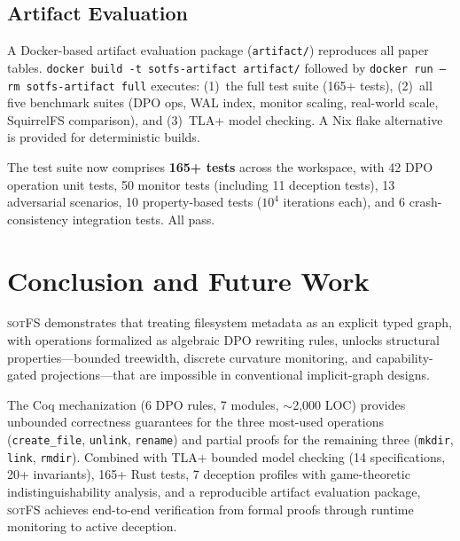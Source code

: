 \documentclass[11pt,a4paper]{article}
\theoremstyle{definition}
\newcommand{\sotfs}{\textsc{sotFS}}
\begin{document}
\subsection{Artifact Evaluation}

A Docker-based artifact evaluation package (\texttt{artifact/}) reproduces all
paper tables.  \texttt{docker build -t sotfs-artifact artifact/} followed by
\texttt{docker run --rm sotfs-artifact full} executes: (1)~the full test suite
(165+ tests), (2)~all five benchmark suites (DPO ops, WAL index, monitor
scaling, real-world scale, SquirrelFS comparison), and (3)~TLA+ model checking.
A Nix flake alternative is provided for deterministic builds.

The test suite now comprises \textbf{165+ tests} across the workspace,
with 42 DPO operation unit tests, 50 monitor tests (including 11 deception
tests), 13 adversarial scenarios, 10 property-based tests ($10^4$ iterations
each), and 6 crash-consistency integration tests.  All pass.

\section{Conclusion and Future Work}

\sotfs{} demonstrates that treating filesystem metadata as an explicit typed
graph, with operations formalized as algebraic DPO rewriting rules, unlocks
structural properties---bounded treewidth, discrete curvature monitoring,
and capability-gated projections---that are impossible in conventional
implicit-graph designs.

The Coq mechanization (6 DPO rules, 7 modules, $\sim$2{,}000 LOC) provides
unbounded correctness guarantees for the three most-used operations
(\texttt{create\_file}, \texttt{unlink}, \texttt{rename}) and partial proofs
for the remaining three (\texttt{mkdir}, \texttt{link}, \texttt{rmdir}).
Combined with TLA+ bounded model checking (14 specifications, 20+ invariants),
165+ Rust tests, 7 deception profiles with game-theoretic indistinguishability
analysis, and a reproducible artifact evaluation package, \sotfs{} achieves
end-to-end verification from formal proofs through runtime monitoring to
active deception.
\end{document}

